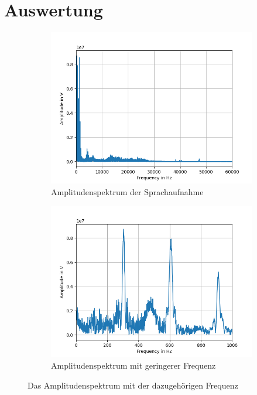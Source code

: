 \documentclass[12pt, oneside, a4paper, \docLanguage]{report}
\begin{document}
\section{Auswertung}
\label{chap:VERSUCH_1_AUSWERTUNG}
\begin{figure}[H]
\centering
	\begin{subfigure}{.5\textwidth}
  		\centering
 		 \includegraphics[width=.95\linewidth]{../data/img/testspektrum1.png}
  		\caption{Amplitudenspektrum der Sprachaufnahme}
 		 \label{fig:sub1}
	\end{subfigure}%
	\begin{subfigure}{.5\textwidth}
  		\centering
 		 \includegraphics[width=.95\linewidth]{../data/img/testspektrum3.png}
  		\caption{Amplitudenspektrum mit geringerer Frequenz}
  		\label{fig:sub2}
	\end{subfigure}
	\caption{Das Amplitudenspektrum mit der dazugehörigen Frequenz}
	\label{fig:test}
\end{figure}
\end{document}
